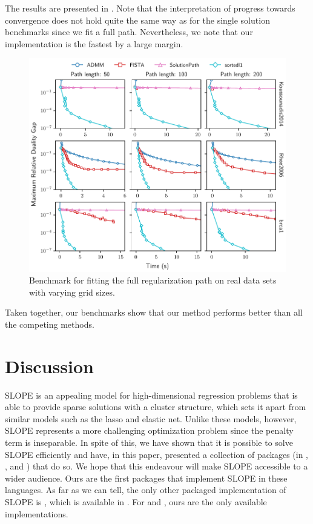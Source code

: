 \documentclass[article]{jss}
\makeatletter
\let\Cref\crtCref
\let\natwidth\Gin@nat@width
\makeatother
\begin{document}
The results are presented in \Cref{fig:real-data-path}. Note that the interpretation
of progress towards convergence does not hold quite the same way as for the single
solution benchmarks since we fit a full path. Nevertheless, we note that our
implementation is the fastest by a large margin.

\begin{figure}[tp]
  \centering
  \includegraphics[width=\natwidth]{images/benchmark_path_real.pdf}
  \caption{%
    Benchmark for fitting the full regularization path on real data sets with
    varying grid sizes.
  }
  \label{fig:real-data-path}
\end{figure}

Taken together, our benchmarks show that our method performs better
than all the competing methods.

\section{Discussion}\label{sec:discussion}

SLOPE is an appealing model for high-dimensional regression problems that is
able to provide sparse solutions with a cluster structure, which sets it apart
from similar models such as the lasso and elastic net. Unlike these models,
however, SLOPE represents a more challenging optimization problem since the
penalty term is inseparable. In spite of this, we have shown that it is
possible to solve SLOPE efficiently and have, in this paper, presented a collection
of packages (in , , and ) that do
so. We hope that this endeavour will make SLOPE accessible to a wider audience.
Ours are the first packages that implement SLOPE in these languages.
As far as we can tell, the only other packaged implementation of SLOPE
is , which is available in . For
 and , ours are the only
available implementations.
\end{document}
